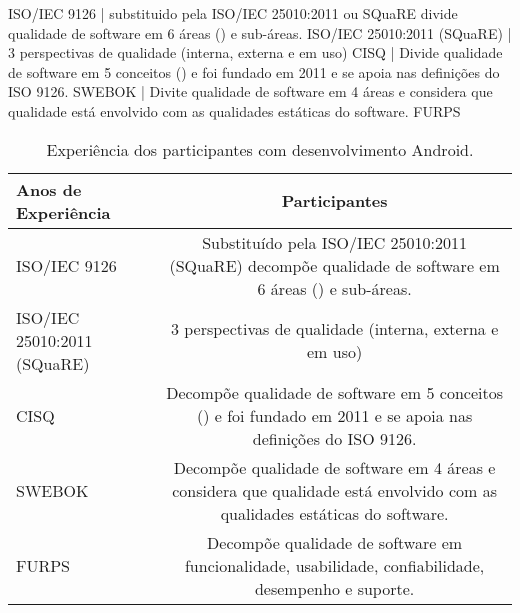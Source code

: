 


  ISO/IEC 9126 | substituido pela ISO/IEC 25010:2011 ou SQuaRE divide qualidade de software em 6 áreas () e sub-áreas.  
  ISO/IEC 25010:2011 (SQuaRE) | 3 perspectivas de qualidade  (interna, externa e em uso)   
  CISQ    | Divide qualidade de software em 5 conceitos () e foi fundado em 2011 e se apoia nas definições do ISO 9126.
  SWEBOK  | Divite qualidade de software em 4 áreas e considera que qualidade está envolvido com as qualidades estáticas do software.
  FURPS 


\begin{table}[h]
\centering
\renewcommand*{\arraystretch}{1}
\small
\begin{tabular}{@{}l|c@{}}
\toprule
\textbf{Anos de Experiência} & \textbf{Participantes} \\
\hline
ISO/IEC 9126                  & Substituído pela ISO/IEC 25010:2011 (SQuaRE) decompõe qualidade de software em 6 áreas () e sub-áreas.   \\
ISO/IEC 25010:2011 (SQuaRE)   & 3 perspectivas de qualidade (interna, externa e em uso)    \\
CISQ                          & Decompõe qualidade de software em 5 conceitos () e foi fundado em 2011 e se apoia nas definições do ISO 9126. \\
SWEBOK                        & Decompõe qualidade de software em 4 áreas e considera que qualidade está envolvido com as qualidades estáticas do software. \\
FURPS                         & Decompõe qualidade de software em funcionalidade, usabilidade, confiabilidade, desempenho e suporte. \\
\toprule
\end{tabular}
\caption{Experiência dos participantes com desenvolvimento Android.}
\label{tab:DadosDemograficos}
\end{table}